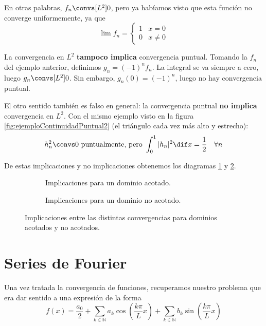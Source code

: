 		En otras palabras, $f_n \convs[L^2] 0$, pero ya habíamos visto que esta función no converge uniformemente, ya que
		\[ \lim f_n =
		\begin{cases}
			1 & x = 0\\
			0 & x \neq 0
		\end{cases}\]

		La convergencia en $L^2$ \textbf{tampoco implica} convergencia puntual. Tomando la $f_n$ del ejemplo anterior, definimos $g_n = (-1)^n f_n$. La integral se va siempre a cero, luego $g_n \convs[L^2] 0$. Sin embargo, $g_n(0) = (-1)^n$, luego no hay convergencia puntual.

		El otro sentido también es falso en general: la convergencia puntual \textbf{no implica} convergencia en $L^2$. Con el mismo ejemplo visto en la figura \ref{fig:ejemploContinuidadPuntual2} (el triángulo cada vez más alto y estrecho):
		\[h_n^2 \convs 0 \text{ puntualmente, pero } \int_0^1 |h_n|^2 \dif x = \frac{1}{2}\quad \forall n \]

		De estas implicaciones y no implicaciones obtenemos los diagramas \ref{fig:diagramaConvergenciasAcotado} y \ref{fig:diagramaConvergenciasNoAcotado}.

		\begin{figure}[thbp]
		\begin{subfigure}[b]{0.48\textwidth}
		\centering
		\caption{Implicaciones para un dominio acotado.}
		\label{fig:diagramaConvergenciasAcotado}
		\end{subfigure}
		\begin{subfigure}[b]{0.48\textwidth}
		\centering
		\caption{Implicaciones para un dominio no acotado.}
		\label{fig:diagramaConvergenciasNoAcotado}
		\end{subfigure}
		\caption{Implicaciones entre las distintas convergencias para dominios acotados y no acotados.}
		\label{fig:DiagramaConvergencias}
		\end{figure}

	\section{Series de Fourier}

		Una vez tratada la convergencia de funciones, recuperamos nuestro problema que era dar sentido a una expresión de la forma
		\[ f(x) = \frac{a_0}{2}+ \sum_{k ∈ ℕ} a_k \cos \left( \frac{k \pi}{L} x \right) + \sum_{k ∈ ℕ} b_k \sin \left( \frac{k \pi}{L} x \right) \]

